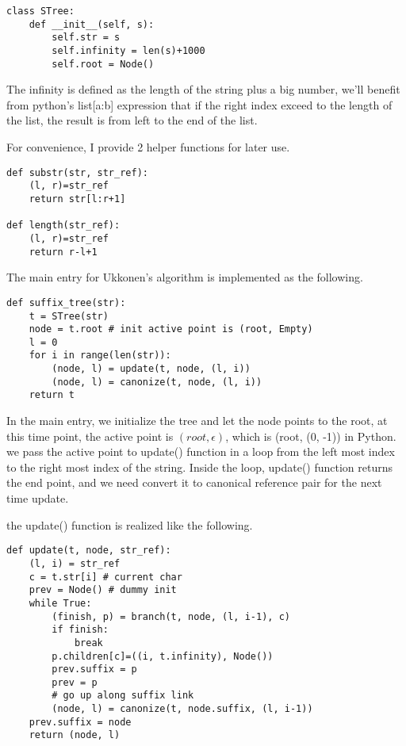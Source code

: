 \documentclass{article}
\begin{document}
\begin{lstlisting}
class STree:
    def __init__(self, s):
        self.str = s
        self.infinity = len(s)+1000
        self.root = Node()
\end{lstlisting}

The infinity is defined as the length of the string plus a big number, we'll
benefit from python's list[a:b] expression that if the right index exceed to the
length of the list, the result is from left to the end of the list.

For convenience, I provide 2 helper functions for later use.

\begin{lstlisting}
def substr(str, str_ref):
    (l, r)=str_ref
    return str[l:r+1]

def length(str_ref):
    (l, r)=str_ref
    return r-l+1
\end{lstlisting}

The main entry for Ukkonen's algorithm is implemented as the following.

\begin{lstlisting}
def suffix_tree(str):
    t = STree(str)
    node = t.root # init active point is (root, Empty)
    l = 0
    for i in range(len(str)):
        (node, l) = update(t, node, (l, i))
        (node, l) = canonize(t, node, (l, i))
    return t
\end{lstlisting}

In the main entry, we initialize the tree and let the node points to the
root, at this time point, the active point is $(root, \epsilon)$, which
is (root, (0, -1)) in Python. we pass the active point to update() function 
in a loop from the left most index to the right most index of the string.
Inside the loop, update() function returns the end point, and we need 
convert it to canonical reference pair for the next time update.

the update() function is realized like the following.

\begin{lstlisting}
def update(t, node, str_ref):
    (l, i) = str_ref 
    c = t.str[i] # current char
    prev = Node() # dummy init 
    while True:
        (finish, p) = branch(t, node, (l, i-1), c)
        if finish:
            break
        p.children[c]=((i, t.infinity), Node())
        prev.suffix = p
        prev = p
        # go up along suffix link
        (node, l) = canonize(t, node.suffix, (l, i-1))
    prev.suffix = node
    return (node, l)
\end{lstlisting}
\end{document}
